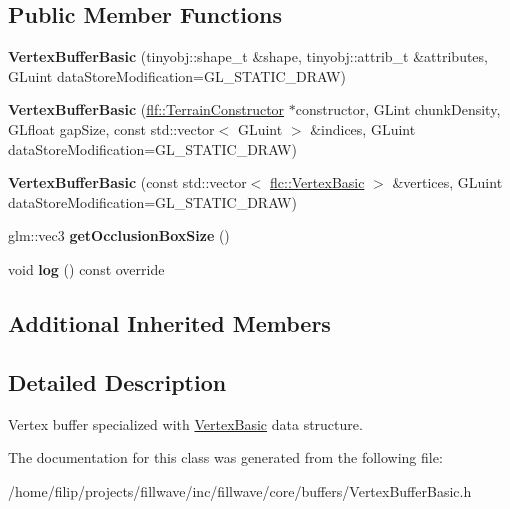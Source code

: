 \subsection*{Public Member Functions}
\begin{DoxyCompactItemize}
\item 
\mbox{\label{classflw_1_1flc_1_1VertexBufferBasic_a6346c0baef0d0343abe53d8ab27df56e}} 
{\bfseries Vertex\+Buffer\+Basic} (tinyobj\+::shape\+\_\+t \&shape, tinyobj\+::attrib\+\_\+t \&attributes, G\+Luint data\+Store\+Modification=G\+L\+\_\+\+S\+T\+A\+T\+I\+C\+\_\+\+D\+R\+AW)
\item 
\mbox{\label{classflw_1_1flc_1_1VertexBufferBasic_aeb237a322d04b866e052eea5adf8ae41}} 
{\bfseries Vertex\+Buffer\+Basic} (\hyperlink{classflw_1_1flf_1_1TerrainConstructor}{flf\+::\+Terrain\+Constructor} $\ast$constructor, G\+Lint chunk\+Density, G\+Lfloat gap\+Size, const std\+::vector$<$ G\+Luint $>$ \&indices, G\+Luint data\+Store\+Modification=G\+L\+\_\+\+S\+T\+A\+T\+I\+C\+\_\+\+D\+R\+AW)
\item 
\mbox{\label{classflw_1_1flc_1_1VertexBufferBasic_af30ad7addc62d33614eaf0cb255d6b38}} 
{\bfseries Vertex\+Buffer\+Basic} (const std\+::vector$<$ \hyperlink{structflw_1_1flc_1_1VertexBasic}{flc\+::\+Vertex\+Basic} $>$ \&vertices, G\+Luint data\+Store\+Modification=G\+L\+\_\+\+S\+T\+A\+T\+I\+C\+\_\+\+D\+R\+AW)
\item 
\mbox{\label{classflw_1_1flc_1_1VertexBufferBasic_a6d2fb7d63312cd32469d532868ee3a7e}} 
glm\+::vec3 {\bfseries get\+Occlusion\+Box\+Size} ()
\item 
\mbox{\label{classflw_1_1flc_1_1VertexBufferBasic_adf1c830a71de6eaffae22c204bfde3b6}} 
void {\bfseries log} () const override
\end{DoxyCompactItemize}
\subsection*{Additional Inherited Members}


\subsection{Detailed Description}
Vertex buffer specialized with \hyperlink{structflw_1_1flc_1_1VertexBasic}{Vertex\+Basic} data structure. 

The documentation for this class was generated from the following file\+:\begin{DoxyCompactItemize}
\item 
/home/filip/projects/fillwave/inc/fillwave/core/buffers/Vertex\+Buffer\+Basic.\+h\end{DoxyCompactItemize}
